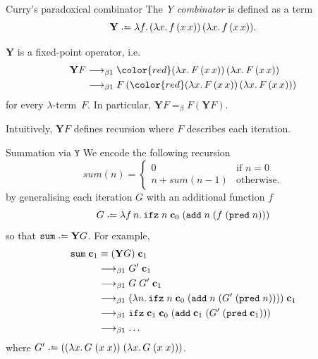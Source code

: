 \begin{frame}{Curry's paradoxical combinator}
  The \emph{Y combinator} is defined as a term 
  \[
    \mathbf{Y} \defeq \lambda f.\, (\lambda x.\, f\,(x\,x))\,(\lambda
    x.\,f\,(x\,x)).
  \]
\begin{proposition}
  $\mathbf{Y}$ is a fixed-point operator, i.e.\ 
  \begin{align*}
    \mathbf{Y}F
    & \onereduce {\color{red} (\lambda x.\,F\,(x\,x))\,(\lambda x.\, F\,(x\,x))} \\
    & \onereduce F\,({\color{red}(\lambda x.\,F\,(x\,x))\,(\lambda x.\, F\,(x\,x))}) \\
  \end{align*}
  for every $\lambda$-term~$F$. In particular, $\mathbf{Y}F =_\beta F(\mathbf{Y}F)$.
\end{proposition}
Intuitively, $\mathbf{Y}F$ defines recursion where $F$ describes each iteration. 
\end{frame}


\begin{frame}{Summation via $\mathtt{Y}$}
  We encode the following recursion
  \[
    \mathit{sum}(n) =
      \begin{cases} 
       0 & \text{if } n = 0 \\
       n + \mathit{sum}(n - 1)  & \text{otherwise}.
      \end{cases}
  \]
  by generalising each iteration $G$ with an additional function $f$
  \[
    G \defeq \lambda f\,n.\, \mathtt{ifz}\;n\;\bc_0\; (\add\;n\;(f\;(\mathtt{pred}\;n)))
  \]
  so that $\mathtt{sum} \defeq \mathbf{Y}G$. For example, 
  \begin{align*}
    \mathtt{sum}\;\mathbf{c}_1
      &\equiv  (\mathbf{Y}G)\;\mathbf{c}_1 \\
      &\longrightarrow_{\beta1} G'\;\mathbf{c}_1 \\
      &\longrightarrow_{\beta1} G\;G'\;\mathbf{c}_1 \\
      &\longrightarrow_{\beta1} (\lambda n.\, \mathtt{ifz}\;n\;\mathbf{c}_0\;
      (\mathtt{add}\;n\;(G'\;(\mathtt{pred}\;n))))\;\mathbf{c}_1 \\
      &\longrightarrow_{\beta1} \mathtt{ifz}\;\mathbf{c}_1\;\mathbf{c}_0\;
      (\mathtt{add}\;\mathbf{c}_1\;(G'\;(\mathtt{pred}\;\mathbf{c}_1))) \\
      &\longrightarrow_{\beta1} \dots
  \end{align*}
  where
  $G' \defeq ((\lambda x.\, G\;(x\;x))\;(\lambda x.\,G\;(x\;x)))$.
\end{frame}
  
